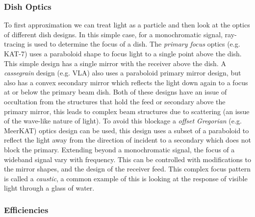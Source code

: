 \documentclass[usenatbib,usegraphicx]{article}
\begin{document}
\subsubsection{Dish Optics}

To first approximation we can treat light as a particle and then look at the optics of different dish designs.
In this simple case, for a monochromatic signal, ray-tracing is used to determine the focus of a dish.
The \emph{primary focus} optics (e.g. KAT-7) uses a paraboloid shape to focus light to a single point above the dish.
This simple design has a single mirror with the receiver above the dish.
A \emph{cassegrain} design (e.g. VLA) also uses a paraboloid primary mirror design, but also has a convex secondary mirror which reflects the light down again to a focus at or below the primary beam dish.
Both of these designs have an issue of occultation from the structures that hold the feed or secondary above the primary mirror, this leads to complex beam structures due to scattering (an issue of the wave-like nature of light).
To avoid this blockage a \emph{offset Gregorian} (e.g. MeerKAT) optics design can be used, this design uses a subset of a paraboloid to reflect the light away from the direction of incident to a secondary which does not block the primary.
Extending beyond a monochromatic signal, the focus of a wideband signal vary with frequency.
This can be controlled with modifications to the mirror shapes, and the design of the receiver feed.
This complex focus pattern is called a \emph{caustic}, a common example of this is looking at the response of visible light through a glass of water.

\subsubsection{Efficiencies}
\end{document}
